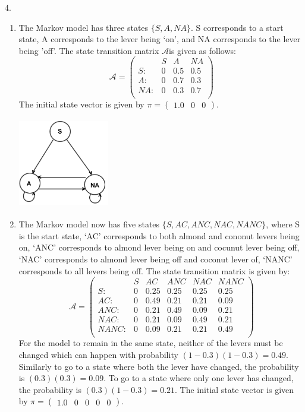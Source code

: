 \documentclass[11pt]{article}
\newcommand{\A}{$\mathcal{A}$\;}
\begin{document}
4.
\begin{enumerate}
	\item The Markov model has three states $\{S,A,NA\}$. S corresponds to a start state, A
	corresponds to the lever being `on', and NA corresponds to the lever being 'off'.
	The state transition matrix \A is given as follows:
	\[ \mathcal{A} = \left( \begin{array}{cccc}
			 		& S & A 	& NA 	\\
			S:  & 0 & 0.5 & 0.5 \\
			A:  & 0 & 0.7 & 0.3 \\
			NA: & 0 & 0.3 & 0.7 \\
		 \end{array} \right)
	\]
	The initial state vector is given by $\pi = ( \begin{array}{ccc} 1.0 & 0 & 0 \end{array} )$.
	
	\begin{center} \includegraphics[width=150px,height=150px]{4a.png} \end{center}
	
	\item The Markov model now has five states $\{S,AC,ANC,NAC,NANC\}$, where S is the start
	state, `AC' corresponds to both almond and cononut levers being on, `ANC' corresponds to
	almond lever being on and cocunut lever being off, `NAC' corresponds to almond lever
	being off and coconut lever of, `NANC' corresponds to all levers being off. The state
	transition matrix is given by:
	\[ \mathcal{A} = \left( \begin{array}{rccccc}
			 		 & S & AC 	& ANC  & NAC  & NANC \\
			S:   & 0 & 0.25 & 0.25 & 0.25 & 0.25 \\
			AC:  & 0 & 0.49 & 0.21 & 0.21 & 0.09 \\
			ANC: & 0 & 0.21 & 0.49 & 0.09 & 0.21 \\
			NAC: & 0 & 0.21 & 0.09 & 0.49 & 0.21 \\
			NANC:& 0 & 0.09 & 0.21 & 0.21 & 0.49 \\
		 \end{array} \right)
	\]
	For the model to remain in the same state, neither of the levers must be changed which can
	happen with probability $(1-0.3)(1-0.3) = 0.49$. Similarly to go to a state where both the
	lever have changed, the probability is $(0.3)(0.3) = 0.09$. To go to a state where only one
	lever has changed, the probability is $(0.3)(1-0.3) = 0.21$.
	The initial state vector is given by $\pi = ( \begin{array}{ccccc} 1.0 & 0 & 0 & 0 & 0 \end{array} )$.
	

\end{enumerate}
\end{document}
